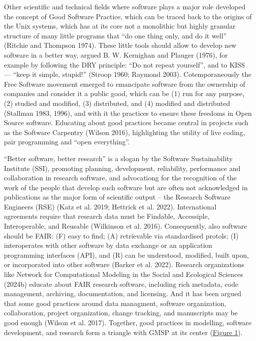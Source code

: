 \documentclass[preprint,11pt,5p]{elsarticle}
\begin{document}
Other scientific and technical fields where software plays a major role
developed the concept of Good Software Practice, which can be traced
back to the origins of the Unix systems, which has at its core not a
monolithic but highly granular structure of many little programs that
``do one thing only, and do it well'' (Ritchie and Thompson 1974). These
little tools should allow to develop new software in a better way,
argued B. W. Kernighan and Plauger (1976), for example by following the
DRY principle: ``Do not repeat yourself'', and to KISS --- ``keep it
simple, stupid!'' (Stroop 1960; Raymond 2003). Cotemporaneously the Free
Software movement emerged to emancipate software from the ownership of
companies and consider it a public good, which can be (1) run for any
purpose, (2) studied and modified, (3) distributed, and (4) modified and
distributed (Stallman 1983, 1996), and with it the practices to ensure
these freedoms in Open Source software. Educating about good practices
became central in projects such as the Software Carpentry (Wilson 2016),
highlighting the utility of live coding, pair programming and ``open
everything''.

``Better software, better research'' is a slogan by the Software
Sustainability Institute (SSI), promoting planning, development,
reliability, performance and collaboration in research software, and
advocationg for the recognition of the work of the people that develop
such software but are often not acknowledged in publications as the
major form of scientific output -- the Research Software Engineers (RSE)
(Katz et al. 2019; Hettrick et al. 2022). International agreements
require that research data must be Findable, Accessiple, Interoperable,
and Reusable (Wilkinson et al. 2016). Consequently, also software should
be FAIR: (F) easy to find; (A) retrievable via standardised protols; (I)
interoperates with other software by data exchange or an application
programming interfaces (API), and (R) can be understood, modified, built
upon, or incorporated into other software (Barker et al. 2022). Research
organizations like Network for Computational Modeling in the Social and
Ecological Sciences (2024b) educate about FAIR research software,
including rich metadata, code management, archiving, documentation, and
licensing. And it has been argued that some good practices around data
managment, software organization, collaboration, project organization,
change tracking, and manuscripts may be good enough (Wilson et al.
2017). Together, good practices in modelling, software development, and
research form a triangle with GMSP at its center
(\hyperref[fig:triangle]{Figure 1}).
\end{document}
